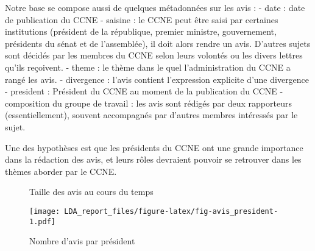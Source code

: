 \documentclass[
  letterpaper,
  DIV=11,
  numbers=noendperiod]{scrartcl}
\begin{document}
Notre base se compose aussi de quelques métadonnées sur les avis : -
date : date de publication du CCNE - saisine : le CCNE peut être saisi
par certaines institutions (président de la république, premier
ministre, gouvernement, présidents du sénat et de l'assemblée), il doit
alors rendre un avis. D'autres sujets sont décidés par les membres du
CCNE selon leurs volontés ou les divers lettres qu'ils reçoivent. -
theme : le thème dans le quel l'administration du CCNE a rangé les avis.
- divergence : l'avis contient l'expression explicite d'une divergence -
president : Président du CCNE au moment de la publication du CCNE -
composition du groupe de travail : les avis sont rédigés par deux
rapporteurs (essentiellement), souvent accompagnés par d'autres membres
intéressés par le sujet.

Une des hypothèses est que les présidents du CCNE ont une grande
importance dans la rédaction des avis, et leurs rôles devraient pouvoir
se retrouver dans les thèmes aborder par le CCNE.

\begin{figure}

\begin{minipage}[t]{0.50\linewidth}

{\centering 


}

\end{minipage}%
%
\begin{minipage}[t]{0.50\linewidth}

{\centering 


}

\end{minipage}%

\caption{\label{fig-longueur}Taille des avis au cours du temps}

\end{figure}

\begin{figure*}

{\centering \texttt{[image: LDA\_report\_files/figure-latex/fig-avis\_president-1.pdf]}

}

\caption{\label{fig-avis_president}Nombre d'avis par président}

\end{figure*}
\end{document}
